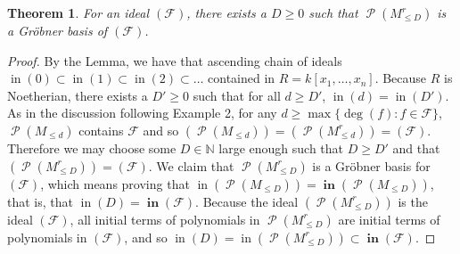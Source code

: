 \documentclass[11pt]{article}
\newcommand{\N}{\mathbb{N}}
\newcommand{\F}{\mathcal{F}}
\DeclareMathOperator{\Poly}{\mathscr{P}}
\DeclareMathOperator{\init}{in}
\DeclareMathOperator{\Init}{\mathbf{in}}
\newtheorem{theorem}{Theorem}
\theoremstyle{definition}
\begin{document}
\begin{theorem}
	For an ideal $(\F)$, there exists a $D \geq 0$ such that $\Poly(M_{\leq D}^r)$ is a Gröbner basis of $(\F)$. 
\end{theorem}

\begin{proof}
	By the Lemma, we have that ascending chain of ideals $\init(0) \subset \init(1) \subset \init(2) \subset \dots$ contained in $R = k[x_1, \dots, x_n]$. Because $R$ is Noetherian, there exists a $D' \geq 0$ such that for all $d \geq D'$, $\init(d) = \init(D')$. As in the discussion following Example 2, for any $d \geq \max\{\deg(f): f \in \F\}$, $\Poly(M_{\leq d})$ contains $\F$ and so $(\Poly(M_{\leq d})) = (\Poly(M_{\leq d}^r)) = (\F)$. Therefore we may choose some $D \in \N$ large enough such that $D \geq D'$ and that $(\Poly(M_{\leq D}^r)) = (\F)$. We claim that $\Poly(M_{\leq D}^r)$ is a Gröbner basis for $(\F)$, which means proving that $\init(\Poly(M_{\leq D})) = \Init(\Poly(M_{\leq D}))$, that is, that $\init(D) = \Init(\F)$. Because the ideal $(\Poly(M_{\leq D}^r))$ is the ideal $(\F)$, all initial terms of polynomials in $\Poly(M_{\leq D}^r)$ are initial terms of polynomials in $(\F)$, and so $\init(D) = \init(\Poly(M_{\leq D}^r)) \subset \Init(\F)$. 


\end{proof}
\end{document}
